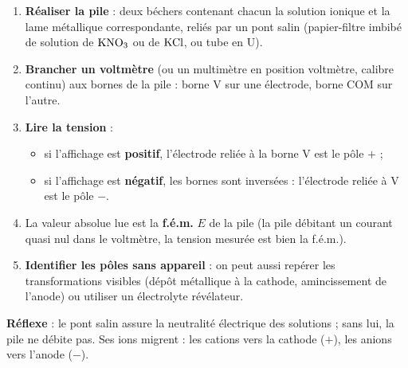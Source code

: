 \documentclass[11pt]{article}
\begin{document}
\begin{methode}
\begin{enumerate}
\item \textbf{Réaliser la pile} : deux béchers contenant chacun la solution ionique et la lame métallique correspondante, reliés par un pont salin (papier-filtre imbibé de solution de $\ce{KNO3}$ ou de $\ce{KCl}$, ou tube en U).
\item \textbf{Brancher un voltmètre} (ou un multimètre en position voltmètre, calibre continu) aux bornes de la pile : borne \og V \fg{} sur une électrode, borne \og COM \fg{} sur l'autre.
\item \textbf{Lire la tension} :
\begin{itemize}
\item si l'affichage est \textbf{positif}, l'électrode reliée à la borne \og V \fg{} est le pôle $+$ ;
\item si l'affichage est \textbf{négatif}, les bornes sont inversées : l'électrode reliée à \og V \fg{} est le pôle $-$.
\end{itemize}
\item La valeur absolue lue est la \textbf{f.é.m.} $E$ de la pile (la pile débitant un courant quasi nul dans le voltmètre, la tension mesurée est bien la f.é.m.).
\item \textbf{Identifier les pôles sans appareil} : on peut aussi repérer les transformations visibles (dépôt métallique à la cathode, amincissement de l'anode) ou utiliser un électrolyte révélateur.
\end{enumerate}
\textbf{Réflexe} : le pont salin assure la neutralité électrique des solutions ; sans lui, la pile ne débite pas. Ses ions migrent : les cations vers la cathode ($+$), les anions vers l'anode ($-$).
\end{methode}
\end{document}
